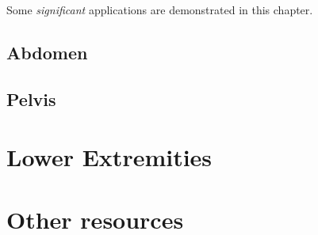 \documentclass[]{book}
\begin{document}
Some \emph{significant} applications are demonstrated in this chapter.

\hypertarget{abdomen-1}{%
\section{Abdomen}\label{abdomen-1}}

\hypertarget{pelvis-1}{%
\section{Pelvis}\label{pelvis-1}}

\hypertarget{lower-extremities-1}{%
\chapter{Lower Extremities}\label{lower-extremities-1}}

\hypertarget{other-resources-1}{%
\chapter{Other resources}\label{other-resources-1}}


\end{document}
